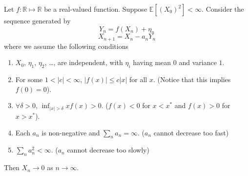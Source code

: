     \begin{theorem}\label{thm:StochasticApproximation}
        Let $f: \mathbb{R} \mapsto \mathbb{R}$ be a real-valued function. Suppose $\mathbb{E}[(X_0)^2] < \infty$. Consider the sequence generated by
        \[ Y_n = f(X_n) + \eta_n \]
        \[ X_{n+1} = X_n - a_n Y_n \]
        where we assume the following conditions
        \begin{enumerate}
            \item $X_0$, $\eta_1$, $\eta_2$, \dots, are independent, with $\eta_i$ having mean $0$ and variance $1$.
            \item For some $1 < |c| < \infty$, $|f(x)| \le c|x|$ for all $x$. (Notice that this implies $f(0)=0$).
            \item $\forall \delta > 0$, $\inf_{|x|>\delta} xf(x) > 0$. ($f(x) < 0$ for $x < x^*$ and $f(x) > 0$ for $x>x^*$).
            \item Each $a_n$ is non-negative and $\sum_n a_n = \infty$. ($a_n$ cannot decrease too fast)
            \item $\sum_n a_n^2 < \infty$. ($a_n$ cannot decrease too slowly)
        \end{enumerate}

        Then $X_n \to 0$ as $n \to \infty$.
    \end{theorem}

